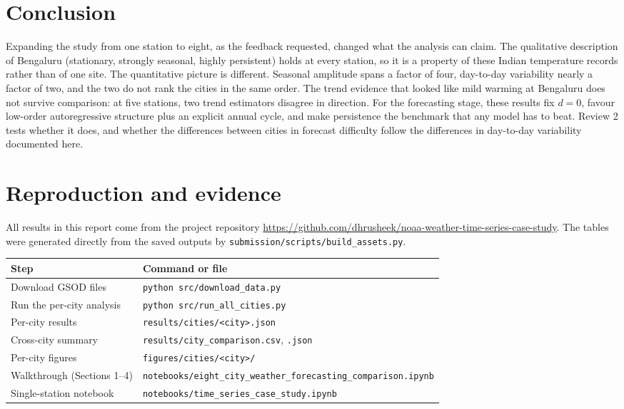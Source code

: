 \documentclass[11pt,a4paper]{article}
\newcommand{\code}[1]{\texttt{#1}}
\begin{document}
\section{Conclusion}
\label{sec:conclusion}

Expanding the study from one station to eight, as the feedback requested, changed what the analysis can claim. The qualitative description of Bengaluru (stationary, strongly seasonal, highly persistent) holds at every station, so it is a property of these Indian temperature records rather than of one site. The quantitative picture is different. Seasonal amplitude spans a factor of four, day-to-day variability nearly a factor of two, and the two do not rank the cities in the same order. The trend evidence that looked like mild warming at Bengaluru does not survive comparison: at five stations, two trend estimators disagree in direction. For the forecasting stage, these results fix $d = 0$, favour low-order autoregressive structure plus an explicit annual cycle, and make persistence the benchmark that any model has to beat. Review 2 tests whether it does, and whether the differences between cities in forecast difficulty follow the differences in day-to-day variability documented here.




\appendix
\section{Reproduction and evidence}
\label{app:repro}

All results in this report come from the project repository \url{https://github.com/dhrusheek/noaa-weather-time-series-case-study}. The tables were generated directly from the saved outputs by \code{submission/scripts/build\_assets.py}.
\begin{center}
\small
\begin{tabular}{@{}ll@{}}
\toprule
Step & Command or file \\
\midrule
Download GSOD files & \code{python src/download\_data.py} \\
Run the per-city analysis & \code{python src/run\_all\_cities.py} \\
Per-city results & \code{results/cities/<city>.json} \\
Cross-city summary & \code{results/city\_comparison.csv}, \code{.json} \\
Per-city figures & \code{figures/cities/<city>/} \\
Walkthrough (Sections 1--4) & \nolinkurl{notebooks/eight_city_weather_forecasting_comparison.ipynb} \\
Single-station notebook & \code{notebooks/time\_series\_case\_study.ipynb} \\
\bottomrule
\end{tabular}
\end{center}
\end{document}
